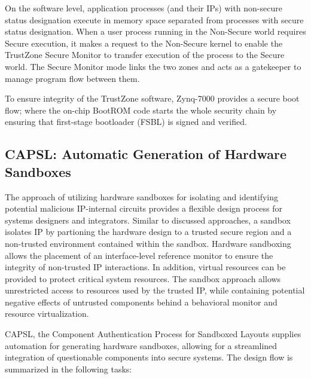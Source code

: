\documentclass[sigconf]{acmart}
\theoremstyle{plain}
\theoremstyle{remark}
\begin{document}
On the software level, application processes (and their IPs) with non-secure status designation execute in memory space separated from processes with secure status designation. When a user process running in the Non-Secure world requires Secure execution, it makes a request to the Non-Secure kernel to enable the TrustZone Secure Monitor to transfer execution of the process to the Secure world. The Secure Monitor mode links the two zones and acts as a gatekeeper to manage program flow between them.

To ensure integrity of the TrustZone software, Zynq-7000 provides a secure boot flow; where the on-chip BootROM code starts the whole security chain by ensuring that first-stage bootloader (FSBL) is signed and verified.

\subsection{CAPSL: Automatic Generation of Hardware Sandboxes}\label{sec:CAPSL}
The approach of utilizing hardware sandboxes for isolating and identifying potential malicious IP-internal circuits provides a flexible design process for systems designers and integrators. Similar to discussed approaches, a sandbox isolates IP by partioning the hardware design to a trusted secure region and a non-trusted environment contained within the sandbox. Hardware sandboxing allows the placement of an interface-level reference monitor to ensure the integrity of non-trusted IP interactions. In addition, virtual resources can be provided to protect critical system resources. The sandbox approach allows unrestricted access to resources used by the trusted IP, while containing potential negative effects of untrusted components behind a behavioral monitor and resource virtualization.

CAPSL, the Component Authentication Process for Sandboxed Layouts supplies automation for generating hardware sandboxes, allowing for a streamlined integration of questionable components into secure systems. The design flow is summarized in the following tasks:
\end{document}

